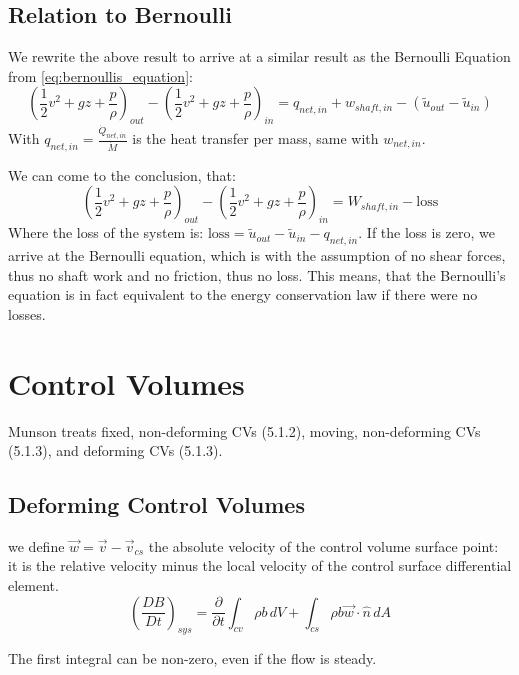 \subsection{Relation to Bernoulli}
We rewrite the above result to arrive at a similar result as the Bernoulli Equation from \eqref{eq:bernoullis_equation}:
\begin{equation*}
	\left(\frac 12 v^2 + gz + \frac p\rho\right)_{out}- \left(\frac 12 v^2 + gz + \frac p\rho\right)_{in}= q_{net,in} + w_{shaft,in}-(\tilde u_{out}-\tilde u_{in})
\end{equation*}
With $ q_{net,in} = \frac{\dot Q_{net,in}}{\dot M}$ is the heat transfer per mass, same with $w_{net,in}$.

We can come to the conclusion, that:
\begin{equation*}
	\left(\frac 12 v^2+gz + \frac p\rho\right)_{out} - 
	\left(\frac 12 v^2+gz + \frac p\rho\right)_{in} =W_{shaft,in} - \mathrm{loss}
\end{equation*}
Where the loss of the system is: $\mathrm{loss}= \tilde u_{out}-\tilde u_{in} - q_{net,in}$. If the loss is zero, we arrive at the Bernoulli equation, which is with the assumption of no shear forces, thus no shaft work and no friction, thus no loss. This means, that the Bernoulli's equation is in fact equivalent to the energy conservation law if there were no losses.


\section{Control Volumes}
Munson treats fixed, non-deforming CVs (5.1.2), moving, non-deforming CVs (5.1.3), and deforming CVs (5.1.3).
\subsection{Deforming Control Volumes}

we define $\vec w = \vec v-\vec v_{cs}$ the absolute velocity of the control volume surface point: it is the relative velocity minus the local velocity of the control surface differential element.
\begin{equation*}
\left(\frac{DB}{Dt}\right)_{sys} = \frac{\partial}{\partial t}\int_{cv} \rho b \,dV + \int_{cs} \rho b \vec w \cdot \hat n \,dA
\end{equation*}

The first integral can be non-zero, even if the flow is steady.


